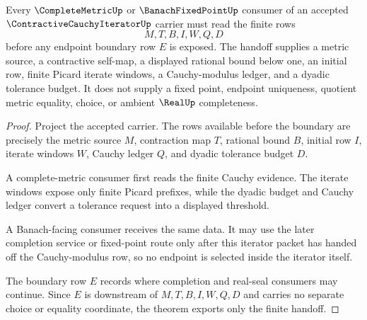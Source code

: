 \begin{theorem}
\label{thm:contractive-cauchy-iterator-completion-handoff}
Every $\CompleteMetricUp$ or $\BanachFixedPointUp$ consumer of an accepted $\ContractiveCauchyIteratorUp$ carrier must read the finite rows
$$
M,T,B,I,W,Q,D
$$
before any endpoint boundary row $E$ is exposed. The handoff supplies a metric source, a contractive self-map, a displayed rational bound below one, an initial row, finite Picard iterate windows, a Cauchy-modulus ledger, and a dyadic tolerance budget. It does not supply a fixed point, endpoint uniqueness, quotient metric equality, choice, or ambient $\RealUp$ completeness.
\end{theorem}
\begin{proof}
Project the accepted carrier. The rows available before the boundary are precisely the metric source $M$, contraction map $T$, rational bound $B$, initial row $I$, iterate windows $W$, Cauchy ledger $Q$, and dyadic tolerance budget $D$.

A complete-metric consumer first reads the finite Cauchy evidence. The iterate windows expose only finite Picard prefixes, while the dyadic budget and Cauchy ledger convert a tolerance request into a displayed threshold.

A Banach-facing consumer receives the same data. It may use the later completion service or fixed-point route only after this iterator packet has handed off the Cauchy-modulus row, so no endpoint is selected inside the iterator itself.

The boundary row $E$ records where completion and real-seal consumers may continue. Since $E$ is downstream of $M,T,B,I,W,Q,D$ and carries no separate choice or equality coordinate, the theorem exports only the finite handoff.
\end{proof}


\begin{closurestatus}{\ContractiveCauchyIteratorUp}
  \theoryclosure{\seedClosure}
  \formalstatus{\unformalizedV}
\end{closurestatus}
